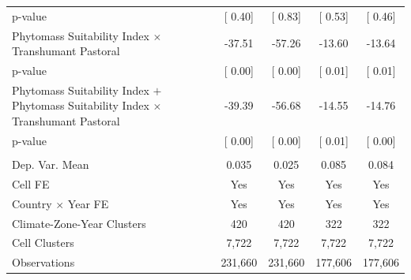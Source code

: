 {\begin{tabular}{l*{4}{c}}
\hspace{15pt} p-value&[     0.40]         &[     0.83]         &[     0.53]         &[     0.46]         \\
[1em] \hspace{15pt} Phytomass Suitability Index $\times$ Transhumant Pastoral&-37.51         &-57.26         &-13.60         &-13.64         \\
\hspace{15pt} p-value&[     0.00]         &[     0.00]         &[     0.01]         &[     0.01]         \\
[1em]  \hspace{15pt} Phytomass Suitability Index $+$ Phytomass Suitability Index $\times$ Transhumant Pastoral&-39.39         &-56.68         &-14.55         &-14.76         \\
\hspace{15pt} p-value&[     0.00]         &[     0.00]         &[     0.01]         &[     0.00]         \\
\hline \\ Dep. Var. Mean& 0.035         & 0.025         & 0.085         & 0.084         \\
Cell FE             &   Yes         &   Yes         &   Yes         &   Yes         \\
Country $\times$ Year FE&   Yes         &   Yes         &   Yes         &   Yes         \\
Climate-Zone-Year Clusters&   420         &   420         &   322         &   322         \\
Cell Clusters       & 7,722         & 7,722         & 7,722         & 7,722         \\
Observations        &231,660         &231,660         &177,606         &177,606         \\
\bottomrule
\end{tabular}
}
